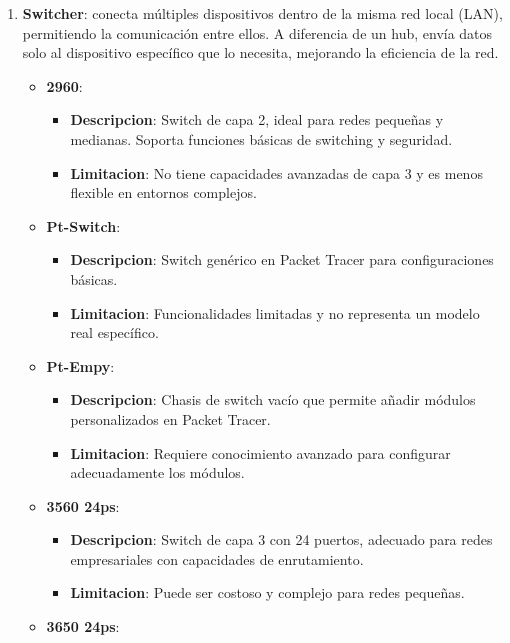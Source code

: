 \documentclass{article}
\begin{document}
\begin{enumerate}
            \item\textbf{Switcher}: conecta múltiples dispositivos dentro de la misma red local (LAN), permitiendo la comunicación entre ellos. A diferencia de un hub, envía datos solo al dispositivo específico que lo necesita, mejorando la eficiencia de la red.
            \begin{itemize}
                \item \textbf{2960}:
                \begin{itemize}
                    \item \textbf{Descripcion}: Switch de capa 2, ideal para redes pequeñas y medianas. Soporta funciones básicas de switching y seguridad.
                    \item \textbf{Limitacion}: No tiene capacidades avanzadas de capa 3 y es menos flexible en entornos complejos.
                \end{itemize}
                \item \textbf{Pt-Switch}:
                \begin{itemize}
                    \item \textbf{Descripcion}: Switch genérico en Packet Tracer para configuraciones básicas.
                    \item \textbf{Limitacion}: Funcionalidades limitadas y no representa un modelo real específico.
                \end{itemize}
                \item \textbf{Pt-Empy}:
                \begin{itemize}
                    \item \textbf{Descripcion}: Chasis de switch vacío que permite añadir módulos personalizados en Packet Tracer.
                    \item \textbf{Limitacion}: Requiere conocimiento avanzado para configurar adecuadamente los módulos.
                \end{itemize}
                \item \textbf{3560 24ps}:
                \begin{itemize}
                    \item \textbf{Descripcion}: Switch de capa 3 con 24 puertos, adecuado para redes empresariales con capacidades de enrutamiento.
                    \item \textbf{Limitacion}: Puede ser costoso y complejo para redes pequeñas.
                \end{itemize}
                \item \textbf{3650 24ps}:

\end{itemize}
\end{enumerate}
\end{document}
